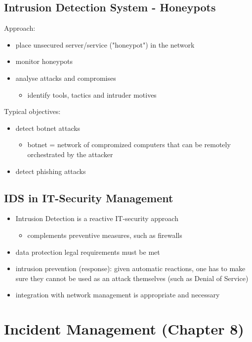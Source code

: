 \documentclass[11pt]{article}
\begin{document}
\subsection{Intrusion Detection System - Honeypots}
\label{sec:org96a3823}
Approach:
\begin{itemize}
\item place unsecured server/service ("honeypot") in the network
\item monitor honeypots
\item analyse attacks and compromises
\begin{itemize}
\item identify tools, tactics and intruder motives
\end{itemize}
\end{itemize}

Typical objectives:
\begin{itemize}
\item detect botnet attacks
\begin{itemize}
\item botnet = network of compromized computers that can be remotely orchestrated by the attacker
\end{itemize}
\item detect phishing attacks
\end{itemize}

\subsection{IDS in IT-Security Management}
\label{sec:org79dd814}
\begin{itemize}
\item Intrusion Detection is a reactive IT-security approach
\begin{itemize}
\item complements preventive measures, such as firewalls
\end{itemize}
\item data protection legal requirements must be met
\item intrusion prevention (response): given automatic reactions, one has to make sure they cannot be used as an attack themselves (such as Denial of Service)
\item integration with network management is appropriate and necessary
\end{itemize}

\section{Incident Management (Chapter 8)}
\label{sec:org04273d5}
\end{document}

